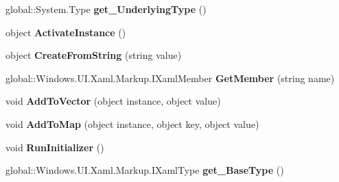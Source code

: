 \begin{DoxyCompactItemize}
global\+::\+System.\+Type {\bfseries get\+\_\+\+Underlying\+Type} ()
\item 
\mbox{\label{interface_windows_1_1_u_i_1_1_xaml_1_1_markup_1_1_i_xaml_type_a808e756aefac346cce2c570d35eb1f2d}} 
object {\bfseries Activate\+Instance} ()
\item 
\mbox{\label{interface_windows_1_1_u_i_1_1_xaml_1_1_markup_1_1_i_xaml_type_a510acbfd71efcb451b2b8f31416e9d57}} 
object {\bfseries Create\+From\+String} (string value)
\item 
\mbox{\label{interface_windows_1_1_u_i_1_1_xaml_1_1_markup_1_1_i_xaml_type_a431f90f38a00401842b28f5ee3917d54}} 
global\+::\+Windows.\+U\+I.\+Xaml.\+Markup.\+I\+Xaml\+Member {\bfseries Get\+Member} (string name)
\item 
\mbox{\label{interface_windows_1_1_u_i_1_1_xaml_1_1_markup_1_1_i_xaml_type_a9542f31b1f9a3d9698ca632ae1a207e2}} 
void {\bfseries Add\+To\+Vector} (object instance, object value)
\item 
\mbox{\label{interface_windows_1_1_u_i_1_1_xaml_1_1_markup_1_1_i_xaml_type_ab81b106f354f661a28e2fe7c1cf529fb}} 
void {\bfseries Add\+To\+Map} (object instance, object key, object value)
\item 
\mbox{\label{interface_windows_1_1_u_i_1_1_xaml_1_1_markup_1_1_i_xaml_type_a43defd106c74e1f61c00f36498126028}} 
void {\bfseries Run\+Initializer} ()
\item 
\mbox{\label{interface_windows_1_1_u_i_1_1_xaml_1_1_markup_1_1_i_xaml_type_a25118da9dba36c6dcde8724ccbe078b0}} 
global\+::\+Windows.\+U\+I.\+Xaml.\+Markup.\+I\+Xaml\+Type {\bfseries get\+\_\+\+Base\+Type} ()
\item 
\mbox{\label{interface_windows_1_1_u_i_1_1_xaml_1_1_markup_1_1_i_xaml_type_aa0f823851084ebadb94e1bc55468b1dc}} 

\end{DoxyCompactItemize}
